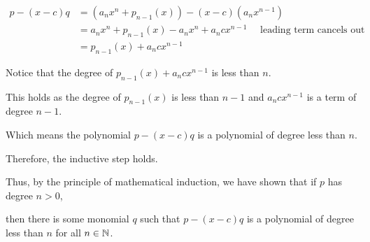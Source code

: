 {{		\begin{align*}
			p - (x-c)q & = (a_{n} x^{n} + p_{n-1}(x)) - (x-c)(a_n x^{n-1})                                            \\
			           & = a_{n} x^{n} + p_{n-1}(x) - a_n x^{n} + a_n c x^{n-1} \quad\text{ leading term cancels out} \\
			           & = p_{n-1}(x) + a_n c x^{n-1}
		\end{align*}

		Notice that the degree of \(p_{n-1}(x) + a_n c x^{n-1}\) is less than \(n\).

		This holds as the degree of \(p_{n-1}(x)\) is less than \(n-1\) and \(a_n c x^{n-1}\) is a term of degree \(n-1\).

		Which means the polynomial \(p - (x-c)q\) is a polynomial of degree less than \(n\).

		Therefore, the inductive step holds.
	}

	\parinf
	Thus, by the principle of mathematical induction, we have shown that if \(p\) has degree \(n>0\),

	then there is some monomial \(q\) such that \(p-(x-c) q\) is a polynomial of degree less than \(n\) for all \(n \in \NN\).
}


